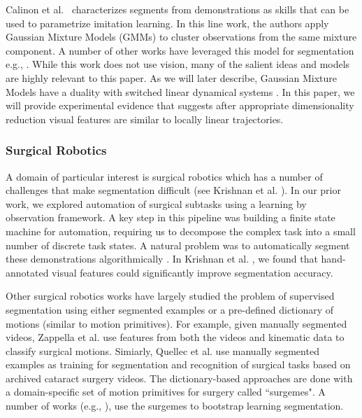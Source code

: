 Calinon et al.~\cite{calinon2014skills, calinon2014task, calinon2010learning} characterizes segments from demonstrations as skills that can be used to parametrize imitation learning.
In this line work, the authors apply Gaussian Mixture Models (GMMs) to cluster observations from the same mixture component.
A number of other works have leveraged this model for segmentation e.g., \cite{konidaris2009efficient, konidaris2011robot, subramanian2011learning}.
While this work does not use vision, many of the salient ideas and models are highly relevant to this paper.
As we will later describe, Gaussian Mixture Models have a duality with switched linear dynamical systems \cite{moldovan2013dirichlet}.
In this paper, we will provide experimental evidence that suggests after appropriate dimensionality reduction visual features are similar to locally linear trajectories.

\subsubsection{Surgical Robotics}
A domain of particular interest is surgical robotics which has a number of challenges that make segmentation difficult (see Krishnan et al. \cite{krishnan2015tsc}).
In our prior work, we explored automation of surgical subtasks \cite{murali2015learning} using a learning by observation framework. 
A key step in this pipeline was building a finite state machine for automation, requiring us to decompose the complex task into a small number of discrete task states.
A natural problem was to automatically segment these demonstrations algorithmically \cite{krishnan2015tsc}.
In Krishnan et al. \cite{krishnan2015tsc}, we found that hand-annotated visual features could significantly improve segmentation accuracy.

Other surgical robotics works have largely studied the problem of supervised segmentation using either segmented examples or a pre-defined dictionary of motions (similar to motion primitives).
For example, given manually segmented videos, Zappella et al. \cite{zappella2013surgical} use features from both the videos and kinematic data to classify surgical motions.
Simiarly, Quellec et al. \cite{quellec2014segmentation} use manually segmented examples as training for segmentation and recognition of surgical tasks based on archived cataract surgery videos. 
The dictionary-based approaches are done with a domain-specific set of motion primitives for surgery called ``surgemes".
A number of works (e.g., \cite{lin2005automatic, varadarajan2009data,tao2013surgical,lea15improved}), use the surgemes to bootstrap learning segmentation.

